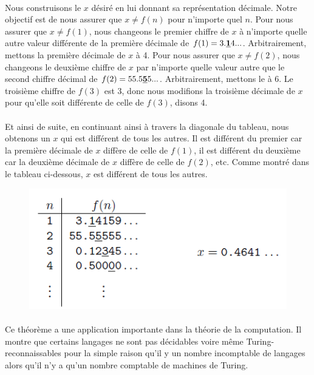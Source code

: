 \paragraph{}
Nous construisons le $x$ désiré en lui donnant sa représentation décimale. Notre objectif est de nous assurer que $x \neq f(n)$ pour n'importe quel $n$. Pour nous assurer que $x \neq f(1)$, nous changeons le premier chiffre de $x$ à n'importe quelle autre valeur différente de la première décimale de $f(1) = 3.\underline{\text{\textbf{1}}}4...$. Arbitrairement, mettons la première décimale de $x$ à 4. Pour nous assurer que $x \neq f(2)$, nous changeons le deuxième chiffre de $x$ par n'importe quelle valeur autre que le second chiffre décimal de $f(2) = 55.5\text{\underline{\textbf{5}}}5...$. Arbitrairement, mettons le à 6. Le troisième chiffre de $f(3)$ est $3$, donc nous modifions la troisième décimale de $x$ pour qu'elle soit différente de celle de $f(3)$, disons 4. 
\paragraph{}
Et ainsi de suite, en continuant ainsi à travers la diagonale du tableau, nous obtenons un $x$ qui est différent de tous les autres. Il est différent du premier car la première décimale de $x$ diffère de celle de $f(1)$, il est différent du deuxième car la deuxième décimale de $x$ diffère de celle de $f(2)$, etc. Comme montré dans le tableau ci-dessous, $x$ est différent de tous les autres. 

\begin{figure}[H]
   \centering
   \includegraphics{img_3_7__1}
\end{figure}

\paragraph{}
Ce théorème a une application importante dans la théorie de la computation. Il montre que certains langages ne sont pas décidables voire même Turing-reconnaissables pour la simple raison qu'il y un nombre incomptable de langages alors qu'il n'y a qu'un nombre comptable de machines de Turing.
